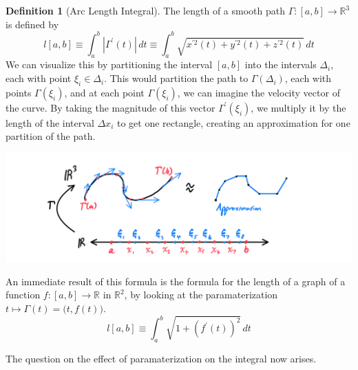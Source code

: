 \documentclass{article}
\theoremstyle{remark}
\theoremstyle{definition}
\newtheorem{definition}{Definition}[section]
\begin{document}
\begin{definition}[Arc Length Integral]
The length of a smooth path $\Gamma: [a, b] \longrightarrow \mathbb{R}^3$ is defined by 
\[l[a, b] \equiv \int_a^b |\Gamma^\prime (t)|\,dt \equiv \int_a^b \sqrt{x^{\prime 2} (t) + y^{\prime 2} (t) + z^{\prime 2} (t)}\, dt\]
We can visualize this by partitioning the interval $[a, b]$ into the intervals $\Delta_i$, each with point $\xi_i \in \Delta_i$. This would partition the path to $\Gamma(\Delta_i)$, each with points $\Gamma(\xi_i)$, and at each point $\Gamma(\xi_i)$, we can imagine the velocity vector of the curve. By taking the magnitude of this vector $\Gamma^\prime (\xi_i)$, we multiply it by the length of the interval $\Delta x_i$ to get one rectangle, creating an approximation for one partition of the path. 
\begin{center}
    \includegraphics[scale=0.32]{img/Arc_Length_Integral.PNG}
\end{center}
An immediate result of this formula is the formula for the length of a graph of a function $f: [a, b] \longrightarrow \mathbb{R}$ in $\mathbb{R}^2$, by looking at the paramaterization $t \mapsto \Gamma(t) = \big(t, f(t)\big)$. 
\[l[a,b] \equiv \int_a^b \sqrt{1 + (f^\prime (t))^2}\,dt\]
\end{definition}

The question on the effect of paramaterization on the integral now arises. 
\end{document}
